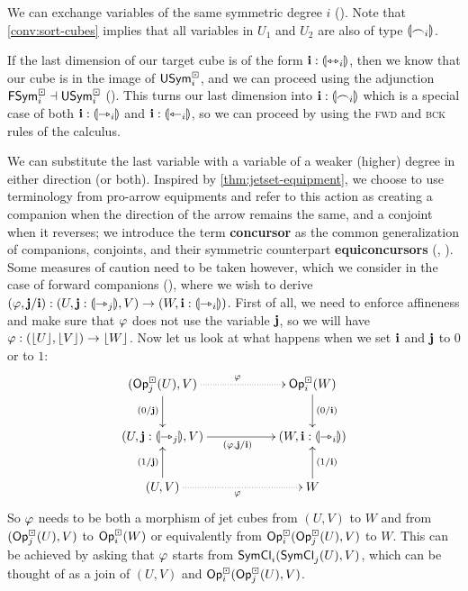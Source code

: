 \documentclass[a4paper]{article}
\begin{document}
We can exchange variables of the same symmetric degree $i$ ().
Note that \cref{conv:sort-cubes} implies that all variables in $U_1$ and $U_2$ are also of type ${\llparenthesis \frown_i \rrparenthesis}$.

If the last dimension of our target cube is of the form $\mathbf{i} : {\llparenthesis \leftrightarrowtriangle_i \rrparenthesis}$, then we know that our cube is in the image of $\mathsf{USym}^\boxdot_i$, and we can proceed using the adjunction $\mathsf{FSym}^\boxdot_i \dashv \mathsf{USym}^\boxdot_i$ ().
This turns our last dimension into $\mathbf{i} : {\llparenthesis \frown_i \rrparenthesis}$ which is a special case of both $\mathbf{i} : {\llparenthesis \rightarrowtriangle_i \rrparenthesis}$ and $\mathbf{i} : {\llparenthesis \leftarrowtriangle_i \rrparenthesis}$, so we can proceed by using the \textsc{fwd} and \textsc{bck} rules of the calculus.

We can substitute the last variable with a variable of a weaker (higher) degree in either direction (or both).
Inspired by \cref{thm:jetset-equipment}, we choose to use terminology from pro-arrow equipments and refer to this action as creating a companion when the direction of the arrow remains the same, and a conjoint when it reverses; we introduce the term \textbf{concursor} as the common generalization of companions, conjoints, and their symmetric counterpart \textbf{equiconcursors} (, ).
Some measures of caution need to be taken however, which we consider in the case of forward companions (), where we wish to derive $(\varphi, \mathbf{j} / \mathbf{i}) : (U, \mathbf{j} : {\llparenthesis \rightarrowtriangle_j \rrparenthesis}, V) \to (W, \mathbf{i} : {\llparenthesis \rightarrowtriangle_i \rrparenthesis})$.
First of all, we need to enforce affineness and make sure that $\varphi$ does not use the variable $\mathbf{j}$, so we will have $\varphi : (\mathopen{}\left\lfloor U \right\rfloor\mathclose{}, \mathopen{}\left\lfloor V \right\rfloor\mathclose{}) \to \mathopen{}\left\lfloor W \right\rfloor\mathclose{}$.
Now let us look at what happens when we set $\mathbf{i}$ and $\mathbf{j}$ to $0$ or to $1$:
\[
	\xymatrix{
		(\Opcube_j(U), V)
			\ar[d]_{(0/\dm j)}
			\ar@{.>}[rr]^\vfi
		&&
		\Opcube_i(W)
			\ar[d]^{(0/\dm i)}
		\\
		(U, \dm j : \rival{\jet_j}, V)
			\ar[rr]_{(\vfi, \dm j / \dm i)}
		&& (W, \dm i : \rival{\jet_i})
		\\
		(U, V)
			\ar[u]^{(1/\dm j)}
			\ar@{.>}[rr]_\vfi
		&&
		W
			\ar[u]_{(1/\dm i)}
	}
\]
So $\varphi$ needs to be both a morphism of jet cubes from $(U, V)$ to $W$ and from $({\mathsf{Op}}^\boxdot_j(U), V)$ to ${\mathsf{Op}}^\boxdot_i(W)$ or equivalently from ${\mathsf{Op}}^\boxdot_i({\mathsf{Op}}^\boxdot_j(U), V)$ to $W$. This can be achieved by asking that $\varphi$ starts from \linebreak $\mathsf{SymCl}_i(\mathsf{SymCl}_j(U), V)$, which can be thought of as a join of $(U, V)$ and ${\mathsf{Op}}^\boxdot_i({\mathsf{Op}}^\boxdot_j(U), V)$.
\end{document}
